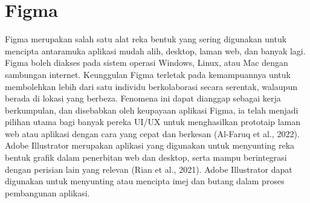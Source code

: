 \section{Figma}
	Figma merupakan salah satu alat reka bentuk yang sering digunakan untuk mencipta antaramuka aplikasi mudah alih, desktop, laman web, dan banyak lagi. Figma boleh diakses pada sistem operasi Windows, Linux, atau Mac dengan sambungan internet. Keunggulan Figma terletak pada kemampuannya untuk membolehkan lebih dari satu individu berkolaborasi secara serentak, walaupun berada di lokasi yang berbeza. Fenomena ini dapat dianggap sebagai kerja berkumpulan, dan disebabkan oleh keupayaan aplikasi Figma, ia telah menjadi pilihan utama bagi banyak pereka UI/UX untuk menghasilkan prototaip laman web atau aplikasi dengan cara yang cepat dan berkesan (Al-Faruq et al., 2022).
	Adobe Illustrator merupakan aplikasi yang digunakan untuk menyunting reka bentuk grafik dalam penerbitan web dan desktop, serta mampu berintegrasi dengan perisian lain yang relevan (Rian et al., 2021). Adobe Illustrator dapat digunakan untuk menyunting atau mencipta imej dan butang dalam proses pembangunan aplikasi.


